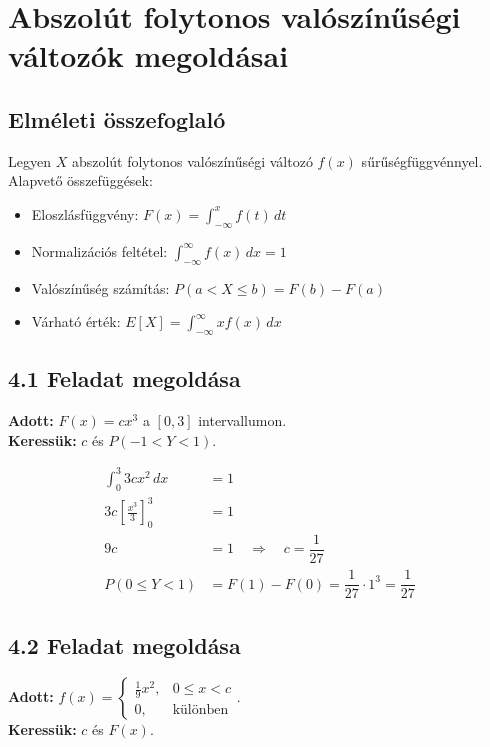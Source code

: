 \documentclass[a4paper, 12pt]{article}
\begin{document}
\section*{Abszolút folytonos valószínűségi változók megoldásai}

\subsection*{Elméleti összefoglaló}
Legyen \( X \) abszolút folytonos valószínűségi változó \( f(x) \) sűrűségfüggvénnyel. Alapvető összefüggések:
\begin{itemize}
    \item Eloszlásfüggvény: \( F(x) = \int_{-\infty}^x f(t) \, dt \)
    \item Normalizációs feltétel: \( \int_{-\infty}^{\infty} f(x) \, dx = 1 \)
    \item Valószínűség számítás: \( P(a < X \leq b) = F(b) - F(a) \)
    \item Várható érték: \( E[X] = \int_{-\infty}^{\infty} x f(x) \, dx \)
\end{itemize}

\subsection*{4.1 Feladat megoldása}
\textbf{Adott:} \( F(x) = c x^3 \) a \( [0, 3] \) intervallumon.\\
\textbf{Keressük:} \( c \) és \( P(-1 < Y < 1) \).

\begin{align*}
    \int_0^3 3c x^2 \, dx &= 1 \\
    3c \left[ \frac{x^3}{3} \right]_0^3 &= 1 \\
    9c &= 1 \quad \Rightarrow \quad \boxed{c = \dfrac{1}{27}} \\
    P(0 \leq Y < 1) &= F(1) - F(0) = \dfrac{1}{27} \cdot 1^3 = \boxed{\dfrac{1}{27}}
\end{align*}

\subsection*{4.2 Feladat megoldása}
\textbf{Adott:} \( f(x) = \begin{cases} \frac{1}{9}x^2, & 0 \leq x < c \\ 0, & \text{különben} \end{cases} \).\\
\textbf{Keressük:} \( c \) és \( F(x) \).
\end{document}
